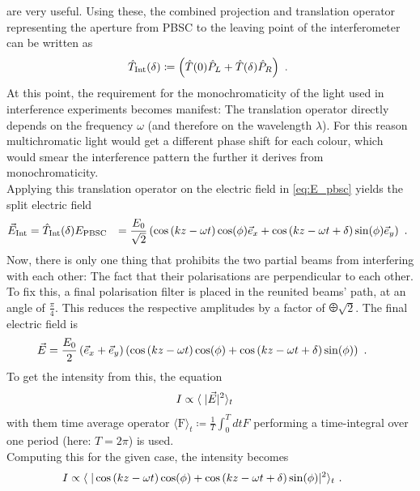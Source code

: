 are very useful. Using these, the combined projection and translation operator representing the aperture from PBSC to the leaving point of the interferometer can be written as 
\begin{align}
  \hat{T}_\text{Int}(\delta) \coloneqq \left(\hat T(0)\hat{P}_L + \hat T(\delta)\hat{P}_R\right) \text{ . }
\end{align}
At this point, the requirement for the monochromaticity of the light used in interference experiments becomes manifest: The translation operator directly depends on the frequency $\omega$ (and therefore on the wavelength $\lambda$). For this reason multichromatic light would get a different phase shift for each colour, which would smear the interference pattern the further it derives from monochromaticity.\\
Applying this translation operator on the electric field in \autoref{eq:E_pbsc} yields the split electric field 
\begin{align}
  \vec{E}_\text{Int} &= \hat{T}_\text{Int}(\delta) E_\text{PBSC} &= \frac{E_0}{\sqrt{2}} \left( \cos\left(kz - \omega t\right) \cos(\phi)\vec{e}_x + \cos\left(kz - \omega t + \delta\right) \sin(\phi) \vec{e}_y \right) \text{ . }
\end{align}
Now, there is only one thing that prohibits the two partial beams from interfering with each other: The fact that their polarisations are perpendicular to each other. To fix this, a final polarisation filter is placed in the reunited beams' path, at an angle of $\frac{\pi}{4}$. This reduces the respective amplitudes by a factor of $\odiv{\sqrt{2}}$. The final electric field is 
\begin{align}
  \vec{E} &= \frac{E_0}{2} \left( \vec{e}_x + \vec{e}_y \right) \left( \cos\left(kz - \omega t\right) \cos(\phi) + \cos\left(kz - \omega t + \delta\right) \sin(\phi) \right) \text{ . }
\end{align}
To get the intensity from this, the equation 
\begin{align}
  I &\propto \langle \hspace{1mm} |\vec{E}|^2\rangle_t
\end{align}
with them time average operator $\langle\text{F}\rangle_t \coloneqq \frac{1}{T}\int_0^T dt F$ performing a time-integral over one period (here: $T = 2\pi$) is used.\\
Computing this for the given case, the intensity becomes
\begin{align}
  I &\propto \langle \hspace{1mm} |\cos\left(kz - \omega t\right) \cos(\phi) + \cos\left(kz - \omega t + \delta\right) \sin(\phi) |^2\rangle_t \text{ . }
\end{align}
